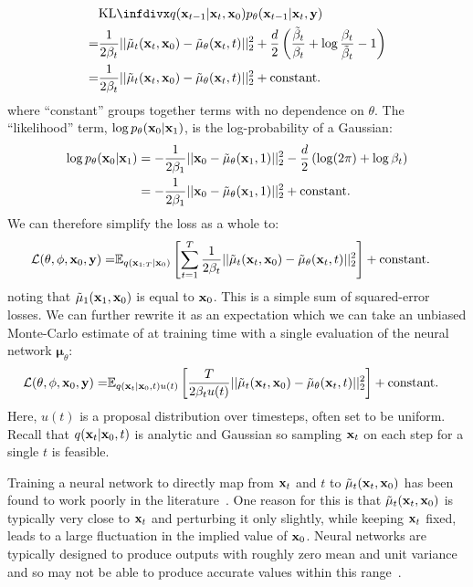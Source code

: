 \begin{align}
    &\kl{q(\rvx_{t-1}|\rvx_t,\rvx_0)}{p_\theta(\rvx_{t-1}|\rvx_t, \rvy)} \\
    =& \frac{1}{2 \beta_t} ||\tilde{\mathbf{\mu}}_t(\rvx_t,\rvx_0) - \tilde{\mathbf{\mu}}_\theta(\rvx_t, t)||_2^2 + \frac{d}{2} \left( \frac{\tilde{\beta}_t}{\beta_t} + \log\frac{\beta_t}{\tilde{\beta}_t} - 1 \right) \\
    =& \frac{1}{2 \beta_t} ||\tilde{\mathbf{\mu}}_t(\rvx_t,\rvx_0) - \tilde{\mathbf{\mu}}_\theta(\rvx_t, t)||_2^2 + \text{constant}.
\end{align}
where ``constant'' groups together terms with no dependence on $\theta$. The ``likelihood'' term, $\log p_\theta({\mathbf{x}}_0|{\mathbf{x}}_1)$, is the log-probability of a Gaussian:
\begin{align}
    \log p_\theta({\mathbf{x}}_0|{\mathbf{x}}_1) &= -\frac{1}{2\beta_1} || {\mathbf{x}}_0 - \tilde{\mathbf{\mu}}_\theta({\mathbf{x}}_1, 1) ||_2^2 - \frac{d}{2}\left( \log(2\pi) + \log \beta_t \right) \\
    &= -\frac{1}{2\beta_1} || {\mathbf{x}}_0 - \tilde{\mathbf{\mu}}_\theta({\mathbf{x}}_1, 1) ||_2^2  + \text{constant}.
\end{align}
We can therefore simplify the loss as a whole to:
\begin{align}
    {\mathcal{L}}(\theta, \phi, {\mathbf{x}}_0, {\mathbf{y}}) =& \mathbb{E}_{q({\mathbf{x}}_{1:T}|{\mathbf{x}}_0)} \left[ \sum_{t=1}^T \frac{1}{2\beta_t} || \tilde{\mathbf{\mu}}_t({\mathbf{x}}_t,{\mathbf{x}}_0) - \tilde{\mathbf{\mu}}_\theta({\mathbf{x}}_t, t) ||_2^2 \right] + \text{constant}.
\end{align}
noting that $\tilde{\mathbf{\mu}}_1({\mathbf{x}}_1,{\mathbf{x}}_0)$ is equal to ${\mathbf{x}}_0$.
This is a simple sum of squared-error losses. We can further rewrite it as an expectation which we can take an unbiased Monte-Carlo estimate of at training time with a single evaluation of the neural network $\mathbf{\mu}_\theta$:
\begin{align} \label{eq:diffusion-mse-loss-mu}
    {\mathcal{L}}(\theta, \phi, {\mathbf{x}}_0, {\mathbf{y}}) =& \mathbb{E}_{q({\mathbf{x}}_t|{\mathbf{x}}_0,t)u(t)} \left[ \frac{T}{2 \beta_t u(t)} || \tilde{\mathbf{\mu}}_t({\mathbf{x}}_t,{\mathbf{x}}_0) - \tilde{\mathbf{\mu}}_\theta({\mathbf{x}}_t, t) ||_2^2 \right] + \text{constant}.
\end{align}
Here, $u(t)$ is a proposal distribution over timesteps, often set to be uniform. Recall that $q({\mathbf{x}}_t|{\mathbf{x}}_0,t)$ is analytic and Gaussian so sampling ${\mathbf{x}}_t$ on each step for a single $t$ is feasible.

Training a neural network to directly map from ${\mathbf{x}}_t$ and $t$ to $\tilde{\mathbf{\mu}}_t({\mathbf{x}}_t,{\mathbf{x}}_0)$ has been found to work poorly in the literature~\cite{ho2020denoising}. One reason for this is that $\tilde{\mathbf{\mu}}_t({\mathbf{x}}_t,{\mathbf{x}}_0)$ is typically very close to ${\mathbf{x}}_t$ and perturbing it only slightly, while keeping ${\mathbf{x}}_t$ fixed, leads to a large fluctuation in the implied value of ${\mathbf{x}}_0$. Neural networks are typically designed to produce outputs with roughly zero mean and unit variance and so may not be able to produce accurate values within this range~\citet{karras2022elucidating}.

